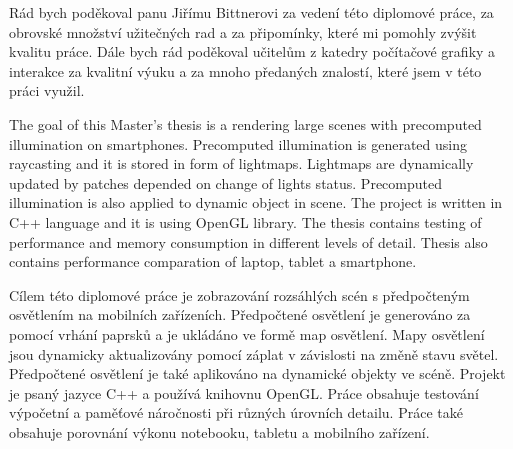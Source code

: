 \documentclass[11pt,twoside,a4paper]{book}
\begin{document}
\coverpagestarts

\acknowledgements
\noindent
Rád bych poděkoval panu Jiřímu Bittnerovi za vedení této diplomové práce, za obrovské množství užitečných rad a za připomínky, které mi pomohly zvýšit kvalitu práce. Dále bych rád poděkoval učitelům z katedry počítačové grafiky a interakce za kvalitní výuku a za mnoho předaných znalostí, které jsem v této práci využil.




\abstractpage
The goal of this Master's thesis is a rendering large scenes with precomputed illumination on smartphones. Precomputed illumination is generated using raycasting and it is stored in form of lightmaps. Lightmaps are dynamically updated by patches depended on change of lights status. Precomputed illumination is also applied to dynamic object in scene. The project is written in C++ language and it is using OpenGL library. The thesis contains testing of performance and memory consumption in different levels of detail. Thesis also contains performance comparation of laptop, tablet a smartphone.

\baselineskip

\noindent
Cílem této diplomové práce je zobrazování rozsáhlých scén s předpočteným osvětlením na mobilních zařízeních. Předpočtené osvětlení je generováno za pomocí vrhání paprsků a je ukládáno ve formě map osvětlení. Mapy osvětlení jsou dynamicky aktualizovány pomocí záplat v závislosti na změně stavu světel. Předpočtené osvětlení je také aplikováno na dynamické objekty ve scéně. Projekt je psaný jazyce C++ a používá knihovnu OpenGL. Práce obsahuje testování výpočetní a paměťové náročnosti při různých úrovních detailu. Práce také obsahuje porovnání výkonu notebooku, tabletu a mobilního zařízení.


\tableofcontents


\listoffigures


\listoftables
\end{document}
